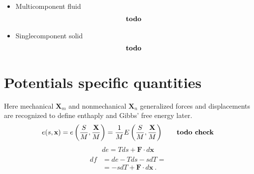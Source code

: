 \documentclass[letterpaper,10pt,english]{jupyterBook}
\begin{document}
\begin{itemize}
\item {} 
\sphinxAtStartPar
Multi\sphinxhyphen{}component fluid
\begin{equation*}
\begin{split}\text{\textbf{todo}}\end{split}
\end{equation*}
\item {} 
\sphinxAtStartPar
Single\sphinxhyphen{}component solid
\begin{equation*}
\begin{split}\text{\textbf{todo}}\end{split}
\end{equation*}
\end{itemize}


\section{Potentials \sphinxhyphen{} specific quantities}
\label{\detokenize{ch/potentials:potentials-specific-quantities}}
\sphinxAtStartPar
Here mechanical \(\mathbf{X}_m\) and non\sphinxhyphen{}mechanical \(\mathbf{X}_n\) generalized forces and displacements are recognized to define enthaply and Gibbs’ free energy later.
\begin{equation*}
\begin{split}e(s, \mathbf{x}) = e \left( \frac{S}{M}, \frac{\mathbf{X}}{M} \right) = \frac{1}{M} E\left( \frac{S}{M}, \frac{\mathbf{X}}{M} \right) \qquad \text{\textbf{todo check}} \end{split}
\end{equation*}
\sphinxAtStartPar
{}
\begin{equation*}
\begin{split}d e = T ds + \mathbf{F} \cdot d \mathbf{x}\end{split}
\end{equation*}
\sphinxAtStartPar
{}
\begin{equation*}
\begin{split}\begin{aligned}
  d f 
  & = de - T d s - s d T= \\
  & =- s d T + \mathbf{F} \cdot d \mathbf{x} \ .
\end{aligned}\end{split}
\end{equation*}
\sphinxAtStartPar
{}
\end{document}
